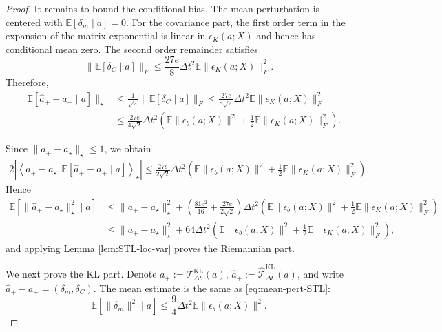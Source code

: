 \documentclass[11pt]{article}
\theoremstyle{plain}
\theoremstyle{definition}
\theoremstyle{remark}
\newcommand{\E}{\mathbb{E}}
\begin{document}
\begin{proof}
    It remains to bound the conditional bias. The mean perturbation is centered with $\E[\delta_m\mid a]=0$.
    For the covariance part, the first order term in the expansion of the matrix exponential is linear in $\epsilon_K(a;X)$ and hence has conditional mean zero. The second order remainder satisfies
    \begin{equation*}
        \|\E[\delta_C\mid a]\|_F
        \leq
        \frac{27e}{8}\Delta t^2
        \E\|\epsilon_K(a;X)\|_F^2.
    \end{equation*}
    Therefore,
    \begin{align*}
        \|\E[\widehat a_+-a_+\mid a]\|_\star
        &\leq
        \frac{1}{\sqrt{2}}\|\E[\delta_C\mid a]\|_F \leq
        \frac{27e}{8\sqrt{2}}\Delta t^2
        \E\|\epsilon_K(a;X)\|_F^2 \\
        &\leq
        \frac{27e}{4\sqrt{2}}\Delta t^2
        \left(
            \E\|\epsilon_b(a;X)\|^2
            +
            \frac{1}{2}\E\|\epsilon_K(a;X)\|_F^2
        \right).
    \end{align*}

    Since $\|a_+-a_\star\|_\star\leq 1$, we obtain
    \begin{align*}
        2\left|
            \left\langle 
                a_+-a_\star,
                \E[\widehat a_+-a_+\mid a]
            \right\rangle_\star
        \right| \leq
        \frac{27e}{2\sqrt{2}}\Delta t^2
        \left(
            \E\|\epsilon_b(a;X)\|^2
            +
            \frac{1}{2}\E\|\epsilon_K(a;X)\|_F^2
        \right).
    \end{align*}
    Hence
    \begin{align*}
        \E[\|\widehat a_+-a_\star\|_\star^2\mid a]
        &\leq
        \|a_+-a_\star\|_\star^2 +
        \left(
            \frac{81e^2}{16}
            +
            \frac{27e}{2\sqrt{2}}
        \right)
        \Delta t^2
        \left(
            \E\|\epsilon_b(a;X)\|^2
            +
            \frac{1}{2}\E\|\epsilon_K(a;X)\|_F^2
        \right) \\
        &\leq
        \|a_+-a_\star\|_\star^2
        +
        64\Delta t^2
        \left(
            \E\|\epsilon_b(a;X)\|^2
            +
            \frac{1}{2}\E\|\epsilon_K(a;X)\|_F^2
        \right),
    \end{align*}
    and applying Lemma \ref{lem:STL-loc-var} proves the Riemannian part.

    We next prove the KL part. Denote
        $a_+ := \mathcal{T}_{\Delta t}^{\mathrm{KL}}(a)$, 
        $\widehat a_+ := \widehat{\mathcal{T}}_{\Delta t}^{\mathrm{KL}}(a)$,
    and write $\widehat a_+-a_+ = (\delta_m,\delta_C)$. The mean estimate is the same as \eqref{eq:mean-pert-STL}:
    \begin{equation}\label{eq:mean-pert-KL}
        \E[\|\delta_m\|^2\mid a]
        \leq
        \frac{9}{4}\Delta t^2\E\|\epsilon_b(a;X)\|^2.
    \end{equation}


\end{proof}
\end{document}

